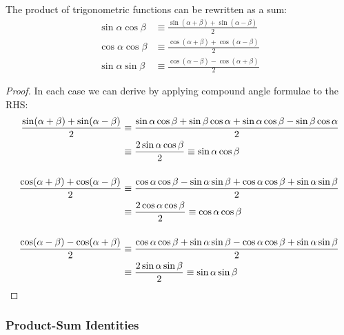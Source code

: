 \begin{theorem}
The product of trigonometric functions can be rewritten as a sum:
\begin{align*}
\sin \alpha \cos \beta &\equiv
    \frac{\sin(\alpha + \beta) + \sin(\alpha - \beta)} 2 \\
\cos \alpha \cos \beta &\equiv
 \frac{\cos(\alpha + \beta) + \cos(\alpha - \beta)} 2 \\
\sin \alpha \sin \beta &\equiv
 \frac{\cos(\alpha - \beta) - \cos(\alpha + \beta)} 2
\end{align*}
\end{theorem}
\begin{proof}
In each case we can derive by applying compound angle formulae to the RHS:
\begin{align*}
\frac{\sin(\alpha + \beta) + \sin(\alpha - \beta)} 2 &\equiv
 \frac{\sin \alpha \cos \beta + \sin \beta \cos \alpha +
       \sin \alpha \cos \beta - \sin \beta \cos \alpha} 2 \\
&\equiv \frac{2 \sin \alpha \cos \beta} 2 \equiv \sin \alpha \cos \beta \\[3ex]
\frac{\cos(\alpha + \beta) + \cos(\alpha - \beta)} 2 &\equiv
 \frac{\cos \alpha \cos \beta - \sin \alpha \sin \beta +
       \cos \alpha \cos \beta + \sin \alpha \sin \beta} 2 \\
&\equiv \frac{2 \cos \alpha \cos \beta} 2 \equiv \cos \alpha \cos \beta \\[3ex]
\frac{\cos(\alpha - \beta) - \cos(\alpha + \beta)} 2 &\equiv
 \frac{\cos \alpha \cos \beta + \sin \alpha \sin \beta -
       \cos \alpha \cos \beta + \sin \alpha \sin \beta} 2 \\
&\equiv \frac{2 \sin \alpha \sin \beta} 2 \equiv \sin \alpha \sin \beta
    \qedhere
\end{align*}
\end{proof}

\subsubsection{Product-Sum Identities} \label{sec_trig_product_sum}



